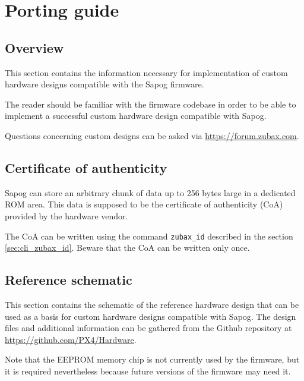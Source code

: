 \documentclass{zubaxdoc}
\begin{document}
\chapter{Porting guide}\label{sec:porting_guide}

\section{Overview}

This section contains the information necessary for implementation of custom hardware designs compatible with the
Sapog firmware.

The reader should be familiar with the firmware codebase in order to be able to implement a successful
custom hardware design compatible with Sapog.

Questions concerning custom designs can be asked via \url{https://forum.zubax.com}.

\section{Certificate of authenticity}

Sapog can store an arbitrary chunk of data up to 256 bytes large in a dedicated ROM area.
This data is supposed to be the certificate of authenticity (CoA) provided by the hardware vendor.

The CoA can be written using the command \verb|zubax_id| described in the section
\ref{sec:cli_zubax_id}.
Beware that the CoA can be written only once.

\section{Reference schematic}

This section contains the schematic of the reference hardware design that can be used as a basis for custom hardware
designs compatible with Sapog.
The design files and additional information can be gathered from the Github repository at
\url{https://github.com/PX4/Hardware}.

Note that the EEPROM memory chip is not currently used by the firmware,
but it is required nevertheless because future versions of the firmware may need it.
\end{document}
